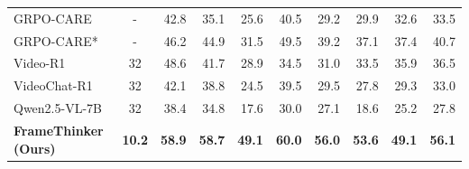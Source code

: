 \begin{table}[ht]
{\begin{tabular}{l c rrrrrrrr}
        GRPO-CARE~\citep{chen2025grpo} & - & 42.8 &35.1 & 25.6 & 40.5 & 29.2 & 29.9 & 32.6 & 33.5 \\
        GRPO-CARE*~\citep{chen2025grpo} &- & 46.2&44.9&31.5&49.5&39.2&37.1&37.4&40.7 \\        Video-R1~\citep{feng2025videor1} & 32 & 48.6 & 41.7 & 28.9 & 34.5 & 31.0 & 33.5 & 35.9 & 36.5 \\
        VideoChat-R1~\citep{li2025videochatr1} & 32 & 42.1 & 38.8 & 24.5 & 39.5 & 29.5 & 27.8 & 29.3 & 33.0 \\
            Qwen2.5-VL-7B~\citep{QwenVL} & 32 & 38.4 & 34.8 & 17.6 & 30.0 & 27.1 & 18.6 & 25.2 & 27.8 \\
        \midrule
        \rowcolor{ourblue}\textbf{FrameThinker (Ours)} & \textbf{10.2} & \textbf{58.9} & \textbf{58.7} & \textbf{49.1} & \textbf{60.0} & \textbf{56.0} & \textbf{53.6} & \textbf{49.1} & \textbf{56.1} \\
        \bottomrule
    \end{tabular}
    }
\end{table}
